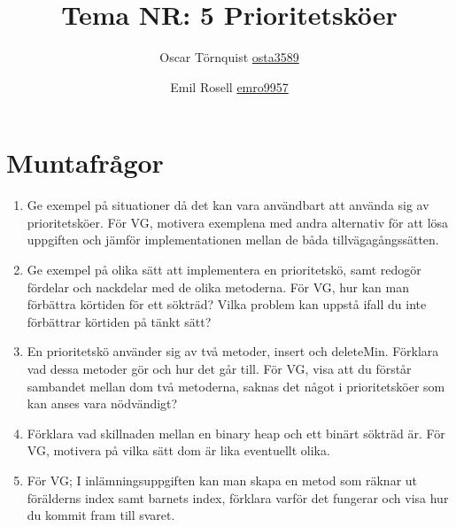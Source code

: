 \documentclass[a5paper,10pt,oneside]{article}
\title{Tema NR: 5 Prioritetsköer }
\author{Oscar Törnquist \url{osta3589} \and Emil Rosell \url{emro9957}}
\begin{document}
\maketitle


\section*{Muntafrågor}
\begin{enumerate}
\item Ge exempel på situationer då det kan vara användbart att använda sig av prioritetsköer. För VG, motivera exemplena med andra alternativ för att lösa uppgiften och jämför implementationen mellan de båda tillvägagångssätten.
\item Ge exempel på olika sätt att implementera en prioritetskö, samt redogör fördelar och nackdelar med de olika metoderna. För VG, hur kan man förbättra körtiden för ett sökträd? Vilka problem kan uppstå ifall du inte förbättrar körtiden på tänkt sätt?
\item En prioritetskö använder sig av två metoder, insert och deleteMin. Förklara vad dessa metoder gör och hur det går till. För VG, visa att du förstår sambandet mellan dom två metoderna, saknas det något i prioritetsköer som kan anses vara nödvändigt?
\item Förklara vad skillnaden mellan en binary heap och ett binärt sökträd är. För VG, motivera på vilka sätt dom är lika eventuellt olika.
\item  För VG; I inlämningsuppgiften kan man skapa en metod som räknar ut förälderns index samt barnets index, förklara varför det fungerar och visa hur du kommit fram till svaret.

\end{enumerate}
\end{document}
